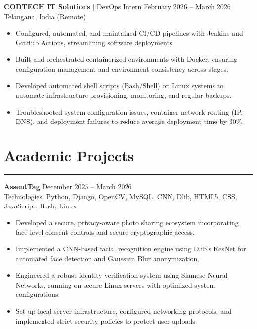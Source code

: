 \documentclass[letterpaper,10pt]{article}
\begin{document}
\textbf{CODTECH IT Solutions} $|$ DevOps Intern \hfill February 2026 -- March 2026 \\
Telangana, India (Remote)
\begin{itemize}
\item Configured, automated, and maintained CI/CD pipelines with Jenkins and GitHub Actions, streamlining software deployments.
\item Built and orchestrated containerized environments with Docker, ensuring configuration management and environment consistency across stages.
\item Developed automated shell scripts (Bash/Shell) on Linux systems to automate infrastructure provisioning, monitoring, and regular backups.
\item Troubleshooted system configuration issues, container network routing (IP, DNS), and deployment failures to reduce average deployment time by 30\%.
\end{itemize}

\section*{Academic Projects}
\hrule
\vspace{4pt}

\textbf{AssentTag} \hfill December 2025 -- March 2026 \\
Technologies: Python, Django, OpenCV, MySQL, CNN, Dlib, HTML5, CSS, JavaScript, Bash, Linux
\begin{itemize}
\item Developed a secure, privacy-aware photo sharing ecosystem incorporating face-level consent controls and secure cryptographic access.
\item Implemented a CNN-based facial recognition engine using Dlib's ResNet for automated face detection and Gaussian Blur anonymization.
\item Engineered a robust identity verification system using Siamese Neural Networks, running on secure Linux servers with optimized system configurations.
\item Set up local server infrastructure, configured networking protocols, and implemented strict security policies to protect user uploads.
\end{itemize}

\vspace{4pt}
\end{document}
